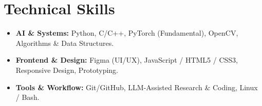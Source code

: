 \documentclass[11pt,a4paper]{article}
\begin{document}
\section*{Technical Skills}
\begin{itemize}[noitemsep]
    \item \textbf{AI \& Systems:} Python, C/C++, PyTorch (Fundamental), OpenCV, Algorithms \& Data Structures.
    \item \textbf{Frontend \& Design:} Figma (UI/UX), JavaScript / HTML5 / CSS3, Responsive Design, Prototyping.
    \item \textbf{Tools \& Workflow:} Git/GitHub, LLM-Assisted Research \& Coding, Linux / Bash.
\end{itemize}
\end{document}
